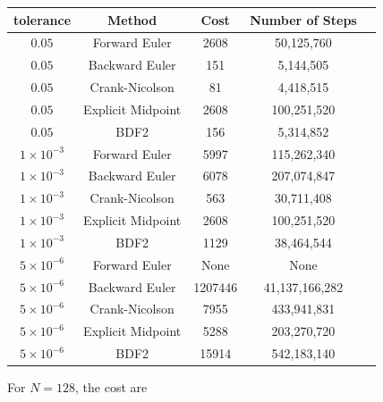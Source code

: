 \documentclass[12pt,answers]{exam}
\begin{document}
    \begin{center}
        \begin{tabular}{|c|c|c|c|c|} \hline
           tolerance & Method & Cost & Number of Steps \\ \hline
           $0.05$ & Forward Euler & 2608 & 50,125,760 \\ \hline
           $0.05$ & Backward Euler & 151 & 5,144,505\\ \hline
           \rowcolor{yellow!30} $0.05$ & Crank-Nicolson & 81 &  4,418,515 \\ \hline
           $0.05$ & Explicit Midpoint & 2608 & 100,251,520 \\ \hline
           $0.05$ & BDF2 & 156 & 5,314,852 \\ \hline
           $1\times10^{-3}$ & Forward Euler & 5997 & 115,262,340 \\ \hline
           $1\times10^{-3}$ & Backward Euler & 6078 & 207,074,847 \\ \hline
           \rowcolor{yellow!30} $1\times10^{-3}$ & Crank-Nicolson & 563 & 30,711,408 \\ \hline
           $1\times10^{-3}$ & Explicit Midpoint & 2608 & 100,251,520 \\ \hline
           $1\times10^{-3}$ & BDF2 & 1129 & 38,464,544 \\ \hline
           $5\times10^{-6}$ & Forward Euler & None & None \\ \hline
           $5\times10^{-6}$ & Backward Euler & 1207446 & 41,137,166,282 \\ \hline
           $5\times10^{-6}$ & Crank-Nicolson & 7955 & 433,941,831 \\ \hline
           \rowcolor{yellow!30} $5\times10^{-6}$ & Explicit Midpoint & 5288 & 203,270,720 \\ \hline
           $5\times10^{-6}$ & BDF2 & 15914 & 542,183,140 \\ \hline
        \end{tabular}
    \end{center}
    For $N = 128$, the cost are 
\end{document}
